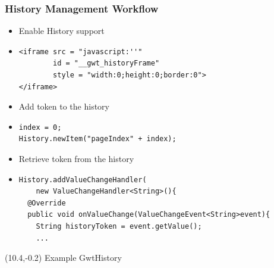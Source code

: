 \documentclass[10pt,table, xcolor=pdflatex]{beamer}
\begin{document}
\begin{frame}[fragile]\frametitle{History Management Workflow}
	\begin{itemize}
		\item Enable History support
        \item[] 
        	\lstset{language=XML, basicstyle=\ttfamily}
        	\begin{lstlisting}
<iframe	src = "javascript:''" 
        id = "__gwt_historyFrame" 
        style = "width:0;height:0;border:0">
</iframe>
        	\end{lstlisting}
		\item Add token to the history
        \item[] 
            \lstset{language=Java, basicstyle=\footnotesize\ttfamily}
            \begin{lstlisting}
index = 0;
History.newItem("pageIndex" + index);
			\end{lstlisting}
		\item Retrieve token from the history
		\item[]
        	\lstset{language=Java, basicstyle=\footnotesize\ttfamily}
            \begin{lstlisting}
History.addValueChangeHandler(
    new ValueChangeHandler<String>(){
  @Override
  public void onValueChange(ValueChangeEvent<String>event){
    String historyToken = event.getValue();
    ...
            \end{lstlisting}
	\end{itemize}
\begin{textblock}{15}(10.4,-0.2)
    {\footnotesize Example GwtHistory}
\end{textblock}
\end{frame}
\end{document}
